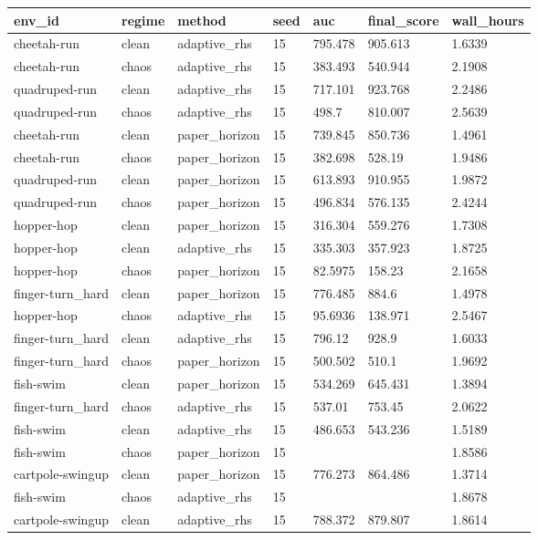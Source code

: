 \begin{tabular}{lllllll}
\toprule
env\_id & regime & method & seed & auc & final\_score & wall\_hours \\
\midrule
cheetah-run & clean & adaptive\_rhs & 15 & 795.478 & 905.613 & 1.6339 \\
cheetah-run & chaos & adaptive\_rhs & 15 & 383.493 & 540.944 & 2.1908 \\
quadruped-run & clean & adaptive\_rhs & 15 & 717.101 & 923.768 & 2.2486 \\
quadruped-run & chaos & adaptive\_rhs & 15 & 498.7 & 810.007 & 2.5639 \\
cheetah-run & clean & paper\_horizon & 15 & 739.845 & 850.736 & 1.4961 \\
cheetah-run & chaos & paper\_horizon & 15 & 382.698 & 528.19 & 1.9486 \\
quadruped-run & clean & paper\_horizon & 15 & 613.893 & 910.955 & 1.9872 \\
quadruped-run & chaos & paper\_horizon & 15 & 496.834 & 576.135 & 2.4244 \\
hopper-hop & clean & paper\_horizon & 15 & 316.304 & 559.276 & 1.7308 \\
hopper-hop & clean & adaptive\_rhs & 15 & 335.303 & 357.923 & 1.8725 \\
hopper-hop & chaos & paper\_horizon & 15 & 82.5975 & 158.23 & 2.1658 \\
finger-turn\_hard & clean & paper\_horizon & 15 & 776.485 & 884.6 & 1.4978 \\
hopper-hop & chaos & adaptive\_rhs & 15 & 95.6936 & 138.971 & 2.5467 \\
finger-turn\_hard & clean & adaptive\_rhs & 15 & 796.12 & 928.9 & 1.6033 \\
finger-turn\_hard & chaos & paper\_horizon & 15 & 500.502 & 510.1 & 1.9692 \\
fish-swim & clean & paper\_horizon & 15 & 534.269 & 645.431 & 1.3894 \\
finger-turn\_hard & chaos & adaptive\_rhs & 15 & 537.01 & 753.45 & 2.0622 \\
fish-swim & clean & adaptive\_rhs & 15 & 486.653 & 543.236 & 1.5189 \\
fish-swim & chaos & paper\_horizon & 15 &  &  & 1.8586 \\
cartpole-swingup & clean & paper\_horizon & 15 & 776.273 & 864.486 & 1.3714 \\
fish-swim & chaos & adaptive\_rhs & 15 &  &  & 1.8678 \\
cartpole-swingup & clean & adaptive\_rhs & 15 & 788.372 & 879.807 & 1.8614 \\

\end{tabular}

